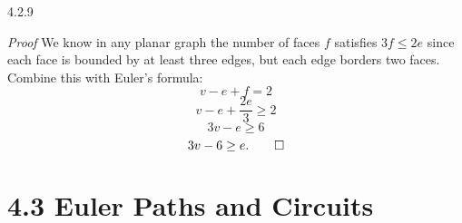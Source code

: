 \documentclass[11pt,]{book}
\makeatletter
\theoremstyle{ptxplainnotitle}
\theoremstyle{ptxplaintitle}
\renewcommand*{\proofname}{Proof}
\renewenvironment{proof}[1][\proofname]{\par
  \pushQED{\qed}%
  \normalfont \topsep6\p@\@plus6\p@\relax
  \trivlist
  \item\relax
    {\itshape
    #1\@addpunct{.}}\hspace\labelsep\ignorespaces
}{%
  \popQED\endtrivlist\@endpefalse
}
\theoremstyle{ptxdefinitionnotitle}
\theoremstyle{ptxdefinitiontitle}
\theoremstyle{ptxdefinitionnotitle}
\theoremstyle{ptxdefinitiontitle}
\theoremstyle{ptxdefinitionnotitle}
\theoremstyle{ptxdefinitiontitle}
\theoremstyle{ptxdefinitiontitlenonumber}
\theoremstyle{ptxdefinitiontitlenonumber}
\numberwithin{equation}{chapter}
\makeatother
\begin{document}
\begin{divisionexercise}{4.2.9}
\textbf{}\begin{proof}\hypertarget{proof-44}{}
\hypertarget{p-2641}{}%
We know in any planar graph the number of faces \(f\) satisfies \(3f \le 2e\) since each face is bounded by at least three edges, but each edge borders two faces. Combine this with Euler's formula:%
\begin{equation*}
v - e + f = 2
\end{equation*}
%
\begin{equation*}
v - e + \frac{2e}{3} \ge 2
\end{equation*}
%
\begin{equation*}
3v - e \ge 6
\end{equation*}
%
\begin{equation*}
3v - 6 \ge e.\qedhere
\end{equation*}
%
\end{proof}
\end{divisionexercise}%
\section*{4.3 Euler Paths and Circuits}
\end{document}
